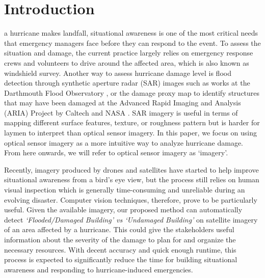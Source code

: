 \documentclass[journal, 12pt, onecolumn,draftclsnofoot]{IEEEtran}
\begin{document}
%
\IEEEpeerreviewmaketitle



\section{Introduction}
% 
% 
% 
% 
 a hurricane makes landfall, situational awareness is one of the most critical needs that emergency managers face before they can respond to the event. To assess the situation and damage, the current practice largely relies on emergency response crews and volunteers to drive around the affected area, which is also known as windshield survey. Another way to assess hurricane damage level is flood detection through synthetic aperture radar (SAR) images such as works at the Darthmouth Flood Observatory \cite{dfo}, or the damage proxy map to identify structures that may have been damaged at the Advanced Rapid Imaging and Analysis (ARIA) Project by Caltech and NASA \cite{aria}. SAR imagery is useful in terms of mapping different surface features, texture, or roughness pattern but is harder for laymen to interpret than optical sensor imagery. %
In this paper, we focus on using optical sensor imagery as a more intuitive way to analyze hurricane damage. From here onwards, we will refer to optical sensor imagery as `imagery'.

Recently, imagery produced by drones and satellites have started to help improve situational awareness from a bird's eye view, but the process still relies on human visual inspection which is generally time-consuming and unreliable during an evolving disaster. Computer vision techniques, therefore, prove to be particularly useful. Given the available imagery, our proposed method can automatically detect \textit{`Flooded/Damaged Building' vs `Undamaged Building'} on satellite imagery of an area affected by a hurricane. This could give the stakeholders useful information about the severity of the damage to plan for and organize the necessary resources. With decent accuracy and quick enough runtime, this process is expected to significantly reduce the time for building situational awareness and responding to hurricane-induced emergencies. 
\end{document}
